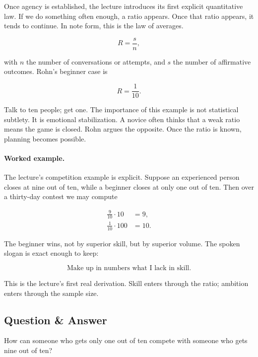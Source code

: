 Once agency is established, the lecture introduces its first explicit quantitative law. If we do something often enough, a ratio appears. Once that ratio appears, it tends to continue. In note form, this is the law of averages.

\begin{equation}
R = \frac{s}{n},
\end{equation}

with \(n\) the number of conversations or attempts, and \(s\) the number of affirmative outcomes. Rohn's beginner case is

\begin{equation}
R=\frac{1}{10}.
\end{equation}

Talk to ten people; get one. The importance of this example is not statistical subtlety. It is emotional stabilization. A novice often thinks that a weak ratio means the game is closed. Rohn argues the opposite. Once the ratio is known, planning becomes possible.

\paragraph{Worked example.}
The lecture's competition example is explicit. Suppose an experienced person closes at nine out of ten, while a beginner closes at only one out of ten. Then over a thirty-day contest we may compute

\begin{align}
\frac{9}{10}\cdot 10 &= 9, \\
\frac{1}{10}\cdot 100 &= 10.
\end{align}

The beginner wins, not by superior skill, but by superior volume. The spoken slogan is exact enough to keep:

\begin{equation}
\text{Make up in numbers what I lack in skill.}
\end{equation}

This is the lecture's first real derivation. Skill enters through the ratio; ambition enters through the sample size.

\subsection{Question \& Answer}

How can someone who gets only one out of ten compete with someone who gets nine out of ten?

